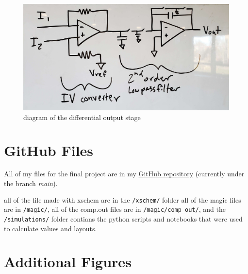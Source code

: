 \documentclass{article}
\begin{document}
\begin{figure}[H]
    \centering{}
    \includegraphics[width=1.0\columnwidth]{images/whiteboard_diagram.jpg}
    \caption{diagram of the differential output stage}
    \label{fig:switched_capacitor_circuit}
\end{figure}


\section{GitHub Files}

All of my files for the final project are in my \href{https://github.com/ianeyk/magic-dds}{GitHub repository} (currently under the branch \emph{main}).

all of the file made with xschem are in the \verb$/xschem/$ folder all of the magic files are in \verb$/magic/$, all of the comp.out files are in \verb$/magic/comp_out/$, and the \verb$/simulations/$ folder contians the python scripts and notebooks that were used to calculate values and layouts.

\section{Additional Figures}
\end{document}
